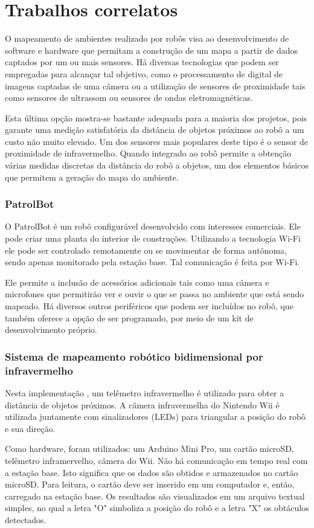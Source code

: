 \chapter{Trabalhos correlatos}

O mapeamento de ambientes realizado por robôs visa ao desenvolvimento de software e hardware que permitam a construção de um mapa a partir de dados captados por um ou mais sensores. Há diversas tecnologias que podem ser empregadas para alcançar tal objetivo, como o processamento de digital de imagens captadas de uma câmera ou a utilização de sensores de proximidade tais como sensores de ultrassom ou sensores de ondas eletromagnéticas.

Esta última opção mostra-se bastante adequada para a maioria dos projetos, pois garante uma medição satisfatória da distância de objetos próximos ao robô a um custo não muito elevado. Um dos sensores mais populares deste tipo é o sensor de proximidade de infravermelho. Quando integrado ao robô permite a obtenção várias medidas discretas da distância do robô a objetos, um dos elementos básicos que permitem a geração do mapa do ambiente.

\subsection{PatrolBot}
O PatrolBot \cite{patrol_bot} é um robô configurável desenvolvido com interesses comerciais. Ele pode criar uma planta do interior de construções. Utilizando a tecnologia Wi-Fi ele pode ser controlado remotamente ou se movimentar de forma autônoma, sendo apenas monitorado pela estação base. Tal comunicação é feita por Wi-Fi.

Ele permite a inclusão de acessórios adicionais tais como uma câmera e microfones que permitirão ver e ouvir o que se passa no ambiente que está sendo mapeado. Há diversos outros periféricos que podem ser incluídos no robô, que também oferece a opção de ser programado, por meio de um kit de desenvolvimento próprio.

\subsection{Sistema de mapeamento robótico bidimensional por infravermelho}

Nesta implementação \cite{wii}, um telêmetro infravermelho é utilizado para obter a distância de objetos próximos. A câmera infravermelha do Nintendo Wii é utilizada juntamente com sinalizadores (LEDs) para triangular a posição do robô e sua direção.

Como hardware, foram utilizados: um Arduino Mini Pro, um cartão microSD, telêmetro inframervelho, câmera do Wii. Não há comunicação em tempo real com a estação base. Isto significa que os dados são obtidos e armazenados no cartão microSD. Para leitura, o cartão deve ser inserido em um computador e, então, carregado na estação base. Os resultados são visualizados em um arquivo textual simples, no qual a letra "O" simboliza a posição do robô e a letra "X" os obtáculos detectados.
